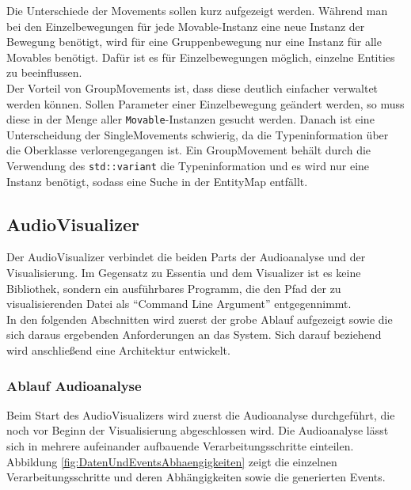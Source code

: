 \documentclass[11pt,a4paper]{article}
\begin{document}
Die Unterschiede der Movements sollen kurz aufgezeigt werden. Während man bei den Einzelbewegungen für jede Movable-Instanz eine neue Instanz der Bewegung benötigt, wird für eine Gruppenbewegung nur eine Instanz für alle Movables benötigt. Dafür ist es für Einzelbewegungen möglich, einzelne Entities zu beeinflussen.\\
Der Vorteil von GroupMovements ist, dass diese deutlich einfacher verwaltet werden können. Sollen Parameter einer Einzelbewegung geändert werden, so muss diese in der Menge aller \lstinline!Movable!-Instanzen gesucht werden. Danach ist eine Unterscheidung der SingleMovements schwierig, da die Typeninformation über die Oberklasse verlorengegangen ist. Ein GroupMovement behält durch die Verwendung des \lstinline!std::variant! die Typeninformation und es wird nur eine Instanz benötigt, sodass eine Suche in der EntityMap entfällt.

\newpage
\subsection{AudioVisualizer}
Der AudioVisualizer verbindet die beiden Parts der Audioanalyse und der Visualisierung. Im Gegensatz zu Essentia und dem Visualizer ist es keine Bibliothek, sondern ein ausführbares Programm, die den Pfad der zu visualisierenden Datei als ``Command Line Argument'' entgegennimmt.\\
In den folgenden Abschnitten wird zuerst der grobe Ablauf aufgezeigt sowie die sich daraus ergebenden Anforderungen an das System. Sich darauf beziehend wird anschließend eine Architektur entwickelt.

\subsubsection{Ablauf Audioanalyse}
\label{sec:AblaufAnalyse}
Beim Start des AudioVisualizers wird zuerst die Audioanalyse durchgeführt, die noch vor Beginn der Visualisierung abgeschlossen wird. Die Audioanalyse lässt sich in mehrere aufeinander aufbauende Verarbeitungsschritte einteilen. Abbildung \ref{fig:DatenUndEventsAbhaengigkeiten} zeigt die einzelnen Verarbeitungsschritte und deren Abhängigkeiten sowie die generierten Events.
\end{document}
